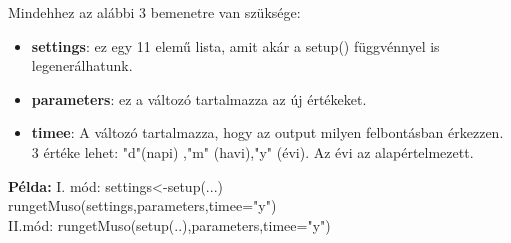 \documentclass[12pt,a4paper]{article}
\begin{document}
Mindehhez az alábbi 3 bemenetre van szüksége:

\begin{itemize}
\item \textbf{settings}: ez egy 11 elemű lista, amit akár a setup() függvénnyel is legenerálhatunk.
\item \textbf{parameters}: ez a változó tartalmazza az új értékeket.
\item \textbf{timee}: A változó tartalmazza, hogy az output milyen felbontásban érkezzen. 3 értéke lehet: "d"(napi) ,"m" (havi),"y" (évi). Az évi az alapértelmezett.
\end{itemize}
\newline \newline
\textbf{Példa:}\newline \newline
I. mód:\newline
settings<-setup(...)\\
rungetMuso(settings,parameters,timee="y")\\
II.mód:\newline
rungetMuso(setup(..),parameters,timee="y")
\end{document}
